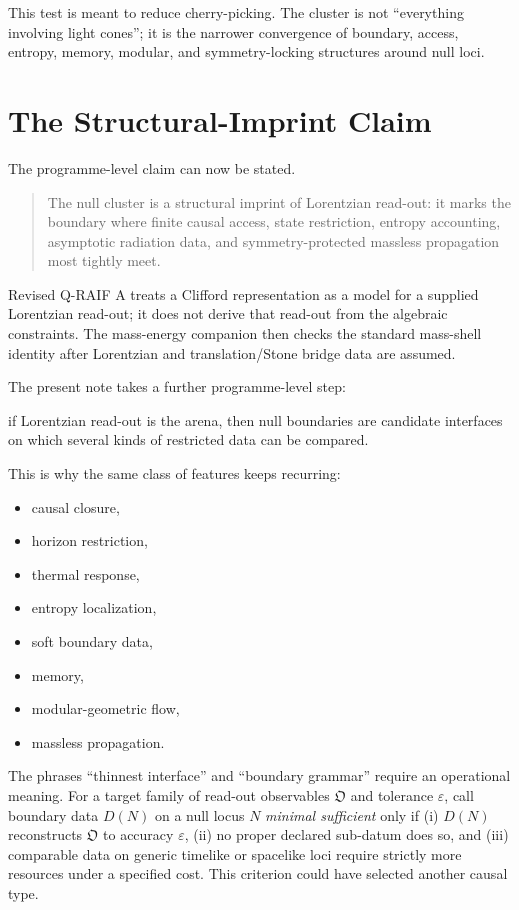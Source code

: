 \documentclass[12pt,a4paper]{article}
\theoremstyle{definition}
\theoremstyle{remark}
\newcommand{\tightlist}{%
  \setlength{\itemsep}{0pt}\setlength{\parskip}{0pt}}
\begin{document}
This test is meant to reduce cherry-picking. The cluster is not
``everything involving light cones''; it is the narrower convergence of
boundary, access, entropy, memory, modular, and symmetry-locking
structures around null loci.

\section{The Structural-Imprint
Claim}\label{the-structural-imprint-claim}

The programme-level claim can now be stated.

\begin{quote}
The null cluster is a structural imprint of Lorentzian read-out: it
marks the boundary where finite causal access, state restriction,
entropy accounting, asymptotic radiation data, and symmetry-protected
massless propagation most tightly meet.
\end{quote}

Revised Q-RAIF A treats a Clifford representation as a model for a
supplied Lorentzian read-out; it does not derive that read-out from the
algebraic constraints. The mass-energy companion then checks the standard
mass-shell identity after Lorentzian and translation/Stone bridge data are
assumed.

The present note takes a further programme-level step:

if Lorentzian read-out is the arena, then null boundaries are candidate
interfaces on which several kinds of restricted data can be compared.

This is why the same class of features keeps recurring:

\begin{itemize}
\tightlist
\item
  causal closure,
\item
  horizon restriction,
\item
  thermal response,
\item
  entropy localization,
\item
  soft boundary data,
\item
  memory,
\item
  modular-geometric flow,
\item
  massless propagation.
\end{itemize}

The phrases ``thinnest interface'' and ``boundary grammar'' require an operational meaning.  For a target family of read-out observables $\mathfrak O$ and tolerance $\varepsilon$, call boundary data $D(N)$ on a null locus $N$ \emph{minimal sufficient} only if (i) $D(N)$ reconstructs $\mathfrak O$ to accuracy $\varepsilon$, (ii) no proper declared sub-datum does so, and (iii) comparable data on generic timelike or spacelike loci require strictly more resources under a specified cost.  This criterion could have selected another causal type.
\end{document}
